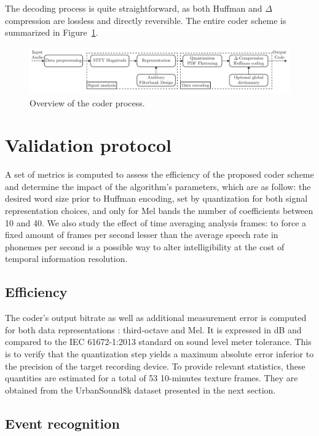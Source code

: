 \documentclass[final,3p,times,twocolumn]{elsarticle}
\begin{document}
The decoding process is quite straightforward, as both Huffman and $\Delta$ compression are lossless and directly reversible. The entire coder scheme is summarized in Figure~\ref{fig:scheme}.

\begin{figure}[htbp]
	\centering
		\includegraphics[width=1\textwidth]{figures/scheme.pdf}
	\caption{Overview of the coder process.}
	\label{fig:scheme}
\end{figure}

\section{Validation protocol} \label{sec:protocol}

A set of metrics is computed to assess the efficiency of the proposed coder scheme and determine the impact of the algorithm's parameters, which are as follow: the desired word size prior to Huffman encoding, set by quantization for both signal representation choices, and only for Mel bands the number of coefficients between 10 and 40. We also study the effect of time averaging analysis frames: to force a fixed amount of frames per second lesser than the average speech rate in phonemes per second is a possible way to alter intelligibility at the cost of temporal information resolution.

\subsection{Efficiency}

The coder's output bitrate as well as additional measurement error is computed for both data representations : third-octave and Mel. It is expressed in dB and compared to the IEC 61672-1:2013 standard \cite{iec-norm2} on sound level meter tolerance. This is to verify that the quantization step yields a maximum absolute error inferior to the precision of the target recording device. To provide relevant statistics, these quantities are estimated for a total of 53 10-minutes texture frames. They are obtained from the UrbanSound8k dataset presented in the next section.

\subsection{Event recognition}
\end{document}

